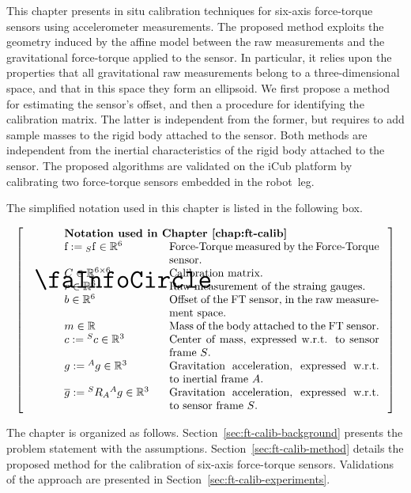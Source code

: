 This chapter presents in situ calibration techniques for six-axis force-torque sensors using accelerometer measurements.
The proposed method exploits the geometry induced by the affine model between the raw measurements and the gravitational force-torque applied to the sensor. 
In particular, it relies upon the properties that all gravitational raw measurements belong to a three-dimensional space, and that in this space they form an ellipsoid.
We first propose a method for estimating the sensor's offset, and then a procedure for identifying
the calibration matrix. The latter is independent from the former, but requires to add sample masses to the rigid body attached to the sensor. Both methods are independent from the inertial characteristics 
of the rigid body attached to the sensor. 
The proposed algorithms are validated on the iCub platform by calibrating
two force-torque sensors embedded in the robot~leg.

The simplified notation used in this chapter is listed in the following box.

\[
  \left[
      \begin{tabular}{@{\quad}m{.05\textwidth}@{\quad}m{.83\textwidth}}
        {\Huge \faInfoCircle} &
          \raggedright%
           \textbf{Notation used in Chapter~\ref{chap:ft-calib}} \par
          \begin{tabular}{@{}p{0.24\textwidth}p{0.55\textwidth}@{}}
              $\rmf := \ls_S \rmf \in \R^6$ & Force-Torque measured by the Force-Torque sensor. \\
               $C \in \R^{6 \times 6}$ & Calibration matrix. \\
               $r \in \R^6$ & Raw measurement of the straing gauges. \\
               $\offset \in \R^6$ & Offset of the FT sensor, in the raw measurement space. \\
               $m \in \R$ & Mass of the body attached to the FT sensor. \\
               $c := \ls^S c \in \R^3$ & Center of mass, expressed w.r.t. to sensor frame $S$. \\
               $g := \ls^A g \in \R^3$ & Gravitation acceleration, expressed w.r.t. to  inertial frame $A$. \\
               $\overline{g} := \ls^S R_A \ls^A g \in \R^3$ & Gravitation acceleration, expressed w.r.t. to  sensor frame $S$. \\
          \end{tabular}
      \end{tabular}
    \right]
\]

The chapter is organized as follows. Section~\ref{sec:ft-calib-background} presents the problem statement with the assumptions. 
Section~\ref{sec:ft-calib-method} details the proposed method for the calibration of six-axis force-torque sensors. 
Validations of the approach are presented in Section~\ref{sec:ft-calib-experiments}.


